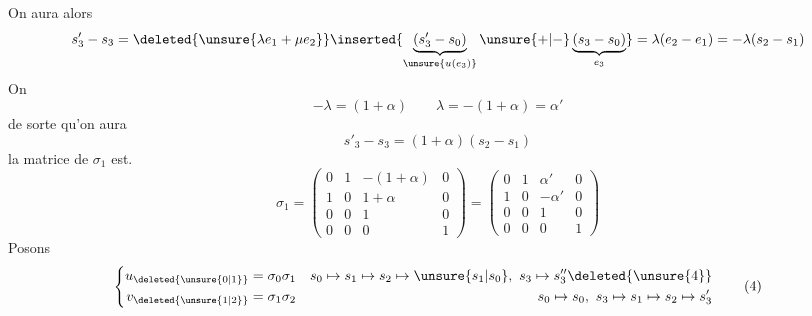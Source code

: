 On aura alors 
\[
s'_3-s_3=\deleted{\unsure{\lambda e_1+\mu e_2}}\inserted{\underbrace{(s'_3-s_0)}_{\unsure{u(e_3)}}\unsure{+|-}\underbrace{(s_3-s_0)}_{e_3}}=\lambda(e_2-e_1)=-\lambda(s_2-s_1)
\]
On 
\[
-\lambda=(1+\alpha)\qquad\lambda=-(1+\alpha)=\alpha'\tag*{(1)}
\]
de sorte qu'on aura
\[
s'_3-s_3=(1+\alpha)(s_2-s_1)\tag*{(2)}
\]
 la matrice de $\sigma_1$ est.
\[
\sigma_1=\begin{pmatrix}0&1&-(1+\alpha)&0\\1&0&1+\alpha&0\\0&0&1&0\\0&0&0&1\end{pmatrix}
=\begin{pmatrix}0&1&\alpha'&0\\1&0&-\alpha'&0\\0&0&1&0\\0&0&0&1\end{pmatrix}\tag*{(3)}
\]
Posons
\[
\left\{\begin{aligned}
u_{\deleted{\unsure{0|1}}}&=\sigma_0\sigma_1
& s_0\mapsto s_1\mapsto s_2\mapsto\unsure{s_1|s_0},\ s_3\mapsto s''_3\deleted{\unsure{4}}\\
v_{\deleted{\unsure{1|2}}}&=\sigma_1\sigma_2
& s_0\mapsto s_0,\ s_3\mapsto s_1\mapsto s_2\mapsto s'_3
\end{aligned}\right.\tag*{(4)}
\]

